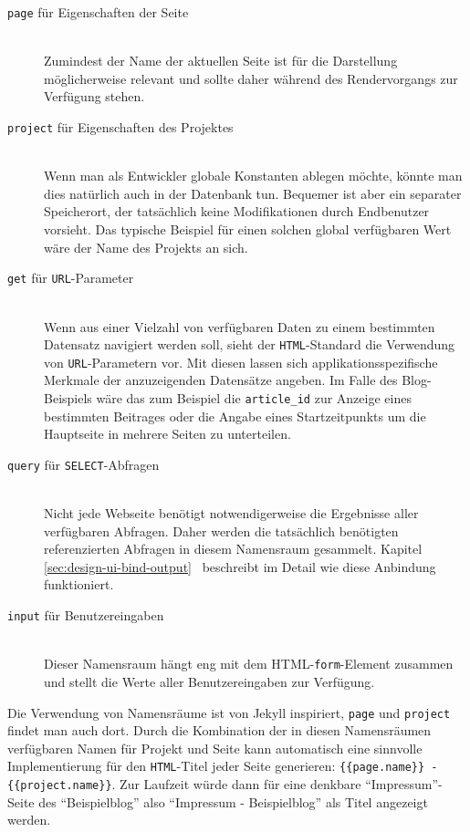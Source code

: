 \begin{description}
\item[\texttt{page} für Eigenschaften der Seite] \hfill \\
  Zumindest der Name der aktuellen Seite ist für die Darstellung möglicherweise relevant und sollte daher während des Rendervorgangs zur Verfügung stehen.
\item[\texttt{project} für Eigenschaften des Projektes] \hfill \\
  Wenn man als Entwickler globale Konstanten ablegen möchte, könnte man dies natürlich auch in der Datenbank tun. Bequemer ist aber ein separater Speicherort, der tatsächlich keine Modifikationen durch Endbenutzer vorsieht. Das typische Beispiel für einen solchen global verfügbaren Wert wäre der Name des Projekts an sich.
\item[\texttt{get} für \texttt{URL}-Parameter] \hfill \\
  Wenn aus einer Vielzahl von verfügbaren Daten zu einem bestimmten Datensatz navigiert werden soll, sieht der \texttt{HTML}-Standard die Verwendung von \texttt{URL}-Parametern vor. Mit diesen lassen sich applikationsspezifische Merkmale der anzuzeigenden Datensätze angeben. Im Falle des Blog-Beispiels wäre das zum Beispiel die \texttt{article\_id} zur Anzeige eines bestimmten Beitrages oder die Angabe eines Startzeitpunkts um die Hauptseite in mehrere Seiten zu unterteilen.
\item[\texttt{query} für \texttt{SELECT}-Abfragen] \hfill \\
  Nicht jede Webseite benötigt notwendigerweise die Ergebnisse aller verfügbaren Abfragen. Daher werden die tatsächlich benötigten referenzierten Abfragen in diesem Namensraum gesammelt. Kapitel \ref{sec:design-ui-bind-output}~ beschreibt im Detail wie diese Anbindung funktioniert.
\item[\texttt{input} für Benutzereingaben] \hfill \\
  Dieser Namensraum hängt eng mit dem HTML-\texttt{form}-Element zusammen und stellt die Werte aller Benutzereingaben zur Verfügung.
\end{description}

Die Verwendung von Namensräume ist von Jekyll inspiriert, \texttt{page} und \texttt{project} findet man auch dort. Durch die Kombination der in diesen Namensräumen verfügbaren Namen für Projekt und Seite kann \idename{} automatisch eine sinnvolle Implementierung für den \texttt{HTML}-Titel jeder Seite generieren: \texttt{\{\{page.name\}\} - \{\{project.name\}\}}. Zur Laufzeit würde dann für eine denkbare "`Impressum"'-Seite des "`Beispielblog"' also "`Impressum - Beispielblog"' als Titel angezeigt werden.

